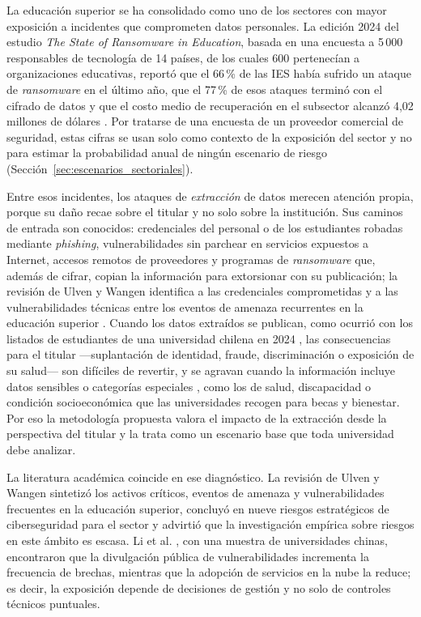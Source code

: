 La educación superior se ha consolidado como uno de los sectores con mayor exposición a incidentes que comprometen datos personales. La edición 2024 del estudio \textit{The State of Ransomware in Education}, basada en una encuesta a 5\,000 responsables de tecnología de 14 países, de los cuales 600 pertenecían a organizaciones educativas, reportó que el 66\,\% de las IES había sufrido un ataque de \textit{ransomware} en el último año, que el 77\,\% de esos ataques terminó con el cifrado de datos y que el costo medio de recuperación en el subsector alcanzó 4,02 millones de dólares \cite{sophos2024education}. Por tratarse de una encuesta de un proveedor comercial de seguridad, estas cifras se usan solo como contexto de la exposición del sector y no para estimar la probabilidad anual de ningún escenario de riesgo (Sección~\ref{sec:escenarios_sectoriales}).

Entre esos incidentes, los ataques de \textit{extracción} de datos merecen atención propia, porque su daño recae sobre el titular y no solo sobre la institución. Sus caminos de entrada son conocidos: credenciales del personal o de los estudiantes robadas mediante \textit{phishing}, vulnerabilidades sin parchear en servicios expuestos a Internet, accesos remotos de proveedores y programas de \textit{ransomware} que, además de cifrar, copian la información para extorsionar con su publicación; la revisión de Ulven y Wangen identifica a las credenciales comprometidas y a las vulnerabilidades técnicas entre los eventos de amenaza recurrentes en la educación superior \cite{ulven2021systematic}. Cuando los datos extraídos se publican, como ocurrió con los listados de estudiantes de una universidad chilena en 2024 \cite{cnnchile2024usm}, las consecuencias para el titular ---suplantación de identidad, fraude, discriminación o exposición de su salud--- son difíciles de revertir, y se agravan cuando la información incluye datos sensibles o categorías especiales \cite[arts.~4 y 25]{lopdp2021}, como los de salud, discapacidad o condición socioeconómica que las universidades recogen para becas y bienestar. Por eso la metodología propuesta valora el impacto de la extracción desde la perspectiva del titular y la trata como un escenario base que toda universidad debe analizar.

La literatura académica coincide en ese diagnóstico. La revisión de Ulven y Wangen \cite{ulven2021systematic} sintetizó los activos críticos, eventos de amenaza y vulnerabilidades frecuentes en la educación superior, concluyó en nueve riesgos estratégicos de ciberseguridad para el sector y advirtió que la investigación empírica sobre riesgos en este ámbito es escasa. Li et al. \cite{li2023breach}, con una muestra de universidades chinas, encontraron que la divulgación pública de vulnerabilidades incrementa la frecuencia de brechas, mientras que la adopción de servicios en la nube la reduce; es decir, la exposición depende de decisiones de gestión y no solo de controles técnicos puntuales.

